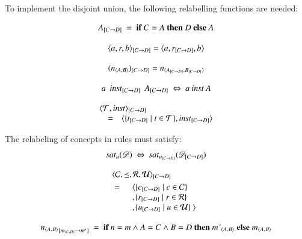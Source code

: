 \documentclass{elsarticle}
\begin{document}
To implement the disjoint union, the following relabelling functions are needed:
\begin{definition}
   \[\subst{C}{D}{A}\ =\ \text{\bf if}\ C=A\ \text{\bf then}\ D\ \text{\bf else}\ A\]
\end{definition}
\begin{definition}
   \[\subst{C}{D}{\triple{a}{r}{b}} = \triple{a}{\subst{C}{D}{r}}{b}\]
\end{definition}
\begin{definition}
   \[\subst{C}{D}{(\declare{n}{A}{B})} = \declare{n}{\subst{C}{D}{A}}{\subst{C}{D}{B}}\]
\end{definition}
\begin{definition}
   \[a\ \subst{C}{D}{\inst}\ \subst{C}{D}{A}\ \Leftrightarrow\ a\inst A\]
\end{definition}
\begin{definition}
   \[\begin{array}{rcl}
      \rlap{$\subst{C}{D}{\pair{\triples}{\inst}}$}\\
      &=&\pair{\{\subst{C}{D}{t}\mid t\in\triples\}}{\subst{C}{D}{\inst}}
   \end{array}\]
\end{definition}
   The relabeling of concepts in rules must satisfy:
\begin{equation}
   \sat{u}{\dataset}\ \Leftrightarrow\ \sat{\subst{C}{D}{u}}{\subst{C}{D}{\dataset}}
\end{equation}
\begin{definition}
   \begin{eqnarray}
      \rlap{$\subst{C}{D}{\quadruple{\concepts}{\isa}{\rels}{\rules}}$}\notag\\
      &=&\begin{array}[t]{l@{}l}
         \la&\{\subst{C}{D}{c}\mid c\in\concepts\}\\
         ,&\{\subst{C}{D}{r}\mid r\in\rels\}\\
         ,&\{\subst{C}{D}{u}\mid u\in\rules\}\ \ra\notag
         \end{array}
   \end{eqnarray}
\end{definition}
\begin{definition}
   \[\subst{\declare{m}{C}{D}}{m'}{{\declare{n}{A}{B}}}\ =\ \text{\bf if}\ n=m\wedge A=C\wedge B=D\ \text{\bf then}\ \declare{m'}{A}{B}\ \text{\bf else}\ \declare{m}{A}{B}\]
\end{definition}
\end{document}
